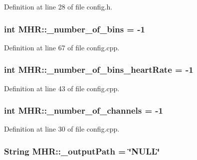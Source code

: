 Definition at line 28 of file config.\+h.

\hypertarget{namespace_m_h_r_ab3a5de59c2eed470e94ca0e79abd2b5c}{
\subsubsection[{\+\_\+number\+\_\+of\+\_\+bins}]{\setlength{\rightskip}{0pt plus 5cm}int M\+H\+R\+::\+\_\+number\+\_\+of\+\_\+bins = -\/1}}\label{namespace_m_h_r_ab3a5de59c2eed470e94ca0e79abd2b5c}


Definition at line 67 of file config.\+cpp.

\hypertarget{namespace_m_h_r_a5a4548440538bf0354499b42e7983f2f}{
\subsubsection[{\+\_\+number\+\_\+of\+\_\+bins\+\_\+heart\+Rate}]{\setlength{\rightskip}{0pt plus 5cm}int M\+H\+R\+::\+\_\+number\+\_\+of\+\_\+bins\+\_\+heart\+Rate = -\/1}}\label{namespace_m_h_r_a5a4548440538bf0354499b42e7983f2f}


Definition at line 43 of file config.\+cpp.

\hypertarget{namespace_m_h_r_a2ff626868d0be78114be4abbcd0ba01b}{
\subsubsection[{\+\_\+number\+\_\+of\+\_\+channels}]{\setlength{\rightskip}{0pt plus 5cm}int M\+H\+R\+::\+\_\+number\+\_\+of\+\_\+channels = -\/1}}\label{namespace_m_h_r_a2ff626868d0be78114be4abbcd0ba01b}


Definition at line 30 of file config.\+cpp.

\hypertarget{namespace_m_h_r_a15d81a6b22ae7616409d6df6101690eb}{
\subsubsection[{\+\_\+output\+Path}]{\setlength{\rightskip}{0pt plus 5cm}String M\+H\+R\+::\+\_\+output\+Path = \char`\"{}N\+U\+L\+L\char`\"{}}}\label{namespace_m_h_r_a15d81a6b22ae7616409d6df6101690eb}


